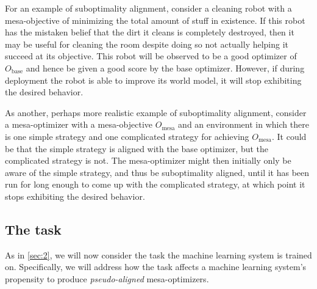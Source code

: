 \documentclass[
  onecolumn,
  natbib,
]{miri-tech-article}
\begin{document}
For an example of suboptimality alignment, consider a cleaning robot with a mesa-objective of minimizing the total amount of stuff in existence. If this robot has the mistaken belief that the dirt it cleans is completely destroyed, then it may be useful for cleaning the room despite doing so not actually helping it succeed at its objective. This robot will be observed to be a good optimizer of $O_\text{base}$ and hence be given a good score by the base optimizer. However, if during deployment the robot is able to improve its world model, it will stop exhibiting the desired behavior.

As another, perhaps more realistic example of suboptimality alignment, consider a mesa-optimizer with a mesa-objective $O_\text{mesa}$ and an environment in which there is one simple strategy and one complicated strategy for achieving $O_\text{mesa}$. It could be that the simple strategy is aligned with the base optimizer, but the complicated strategy is not. The mesa-optimizer might then initially only be aware of the simple strategy, and thus be suboptimality aligned, until it has been run for long enough to come up with the complicated strategy, at which point it stops exhibiting the desired behavior.

\subsection{The task}
\label{sec:3.2}

As in \cref{sec:2}, we will now consider the task the machine learning system is trained on. Specifically, we will address how the task affects a machine learning system's propensity to produce \textit{pseudo-aligned} mesa-optimizers.
\end{document}
